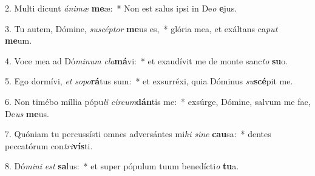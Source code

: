 2. Multi dicunt \textit{á}\textit{ni}\textit{mæ} \textbf{me}æ:~*  Non est salus ipsi in De\textit{o} \textbf{e}jus.\

3. Tu autem, Dómine, \textit{su}\textit{scép}\textit{tor} \textbf{me}us es,~*  glória mea, et exáltans ca\textit{put} \textbf{me}um.\

4. Voce mea ad Dó\textit{mi}\textit{num} \textit{cla}\textbf{má}vi:~*  et exaudívit me de monte sanc\textit{to} \textbf{su}o.\

5. Ego dormívi, \textit{et} \textit{so}\textit{po}\textbf{rá}tus sum:~*  et exsurréxi, quia Dóminus \textit{su}\textbf{scé}pit me.\

6. Non timébo míllia pópu\textit{li} \textit{cir}\textit{cum}\textbf{dán}tis me:~*  exsúrge, Dómine, salvum me fac, De\textit{us} \textbf{me}us.\

7. Quóniam tu percussísti omnes adversántes mi\textit{hi} \textit{si}\textit{ne} \textbf{cau}sa:~*  dentes peccatórum con\textit{tri}\textbf{vís}ti.\

8. Dó\textit{mi}\textit{ni} \textit{est} \textbf{sa}lus:~*  et super pópulum tuum benedícti\textit{o} \textbf{tu}a.\


